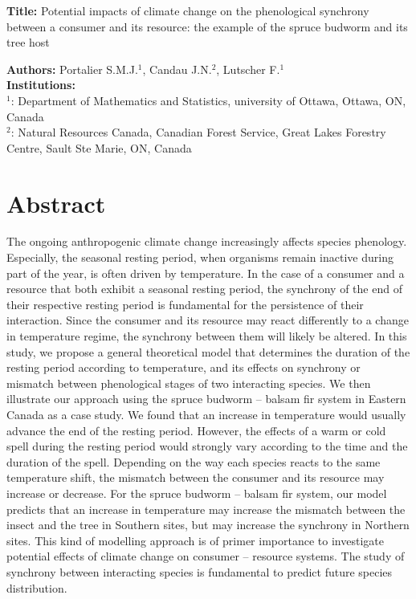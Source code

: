 \documentclass[12 pt]{article}
\begin{document}
\begin{Large}
\noindent \textbf{Title:} Potential impacts of climate change on the phenological synchrony between a consumer and its resource: the example of the spruce budworm and its tree host 
\end{Large}
\vspace{1 cm}

\noindent \textbf{Authors:} Portalier S.M.J.$^{1}$, Candau J.N.$^2$, Lutscher F.$^1$ \\
\textbf{Institutions:} \\
$^1$: Department of Mathematics and Statistics, university of Ottawa, Ottawa, ON, Canada \\
$^2$: Natural Resources Canada, Canadian Forest Service, Great Lakes Forestry Centre, Sault Ste Marie, ON, Canada\\


\section*{Abstract}
The ongoing anthropogenic climate change increasingly affects species phenology. Especially, the seasonal resting period, when organisms remain inactive during part of the year, is often driven by temperature. In the case of a consumer and a resource that both exhibit a seasonal resting period, the synchrony of the end of their respective resting period is fundamental for the persistence of their interaction. Since the consumer and its resource may react differently to a change in temperature regime, the synchrony between them will likely be altered. In this study, we propose a general theoretical model that determines the duration of the resting period according to temperature, and its effects on synchrony or mismatch between phenological stages of two interacting species. We then illustrate our approach using the spruce budworm – balsam fir system in Eastern Canada as a case study. We found that an increase in temperature would usually advance the end of the resting period. However, the effects of a warm or cold spell during the resting period would strongly vary according to the time and the duration of the spell. Depending on the way each species reacts to the same temperature shift, the mismatch between the consumer and its resource may increase or decrease. For the spruce budworm – balsam fir system, our model predicts that an increase in temperature may increase the mismatch between the insect and the tree in Southern sites, but may increase the synchrony in Northern sites. This kind of modelling approach is of primer importance to investigate potential effects of climate change on consumer – resource systems. The study of synchrony between interacting species is fundamental to predict future species distribution.\par
\end{document}
